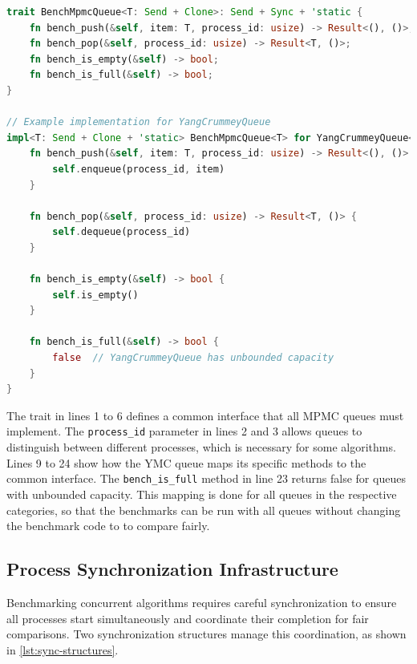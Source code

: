 \begin{lstlisting}[language=Rust, style=boxed, caption={Benchmark trait for MPMC queues}, label={lst:bench-trait}]
trait BenchMpmcQueue<T: Send + Clone>: Send + Sync + 'static {
    fn bench_push(&self, item: T, process_id: usize) -> Result<(), ()>;
    fn bench_pop(&self, process_id: usize) -> Result<T, ()>;
    fn bench_is_empty(&self) -> bool;
    fn bench_is_full(&self) -> bool;
}

// Example implementation for YangCrummeyQueue
impl<T: Send + Clone + 'static> BenchMpmcQueue<T> for YangCrummeyQueue<T> {
    fn bench_push(&self, item: T, process_id: usize) -> Result<(), ()> {
        self.enqueue(process_id, item)
    }

    fn bench_pop(&self, process_id: usize) -> Result<T, ()> {
        self.dequeue(process_id)
    }

    fn bench_is_empty(&self) -> bool {
        self.is_empty()
    }

    fn bench_is_full(&self) -> bool {
        false  // YangCrummeyQueue has unbounded capacity
    }
}
\end{lstlisting}

The trait in lines 1 to 6 defines a common interface that all \ac{MPMC} queues must implement. The \texttt{process\_id} parameter in lines 2 and 3 allows queues to distinguish between different processes, which is necessary for some algorithms. Lines 9 to 24 show how the \ac{YMC} queue maps its specific methods to the common interface. The \texttt{bench\_is\_full} method in line 23 returns false for queues with unbounded capacity. This mapping is done for all queues in the respective categories, so that the benchmarks can be run with all queues without changing the benchmark code to to compare fairly.

\subsection{Process Synchronization Infrastructure}
Benchmarking concurrent algorithms requires careful synchronization to ensure all processes start simultaneously and coordinate their completion for fair comparisons. Two synchronization structures manage this coordination, as shown in \cref{lst:sync-structures}.

